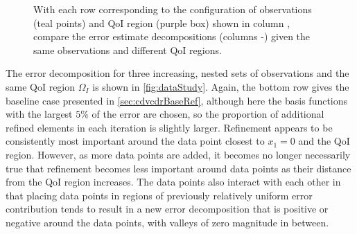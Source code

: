 \begin{figure}[htbp]
\centering
{}
  \caption{With each row corresponding to the configuration of observations (teal points) and QoI region (purple box) shown in column \protect{}, compare the error estimate decompositions (columns \protect{}-\protect{}) given the same observations and different QoI regions.}
  \label{fig:qoiStudy}
\end{figure}

The error decomposition for three increasing, nested sets of observations and the same QoI region $\Omega_I$ is shown in \cref{fig:dataStudy}. Again, the bottom row gives the baseline case presented in \cref{sec:cdvcdrBaseRef}, although here the basis functions with the largest $5\%$ of the error are chosen, so the proportion of additional refined elements in each iteration is slightly larger. Refinement appears to be consistently most important around the data point closest to $x_1=0$ and the QoI region. However, as more data points are added, it becomes no longer necessarily true that refinement becomes less important around data points as their distance from the QoI region increases. The data points also interact with each other in that placing data points in regions of previously relatively uniform error contribution tends to result in a new error decomposition that is positive or negative around the data points, with valleys of zero magnitude in between.


